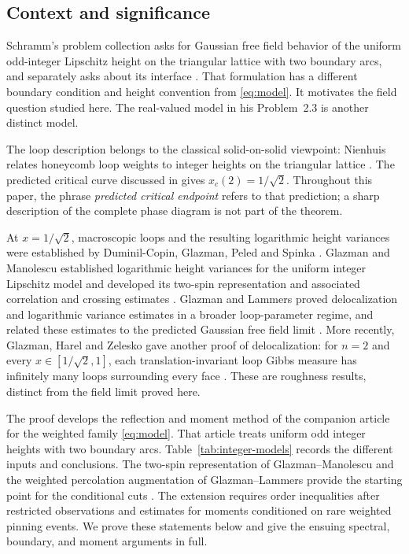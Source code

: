 \subsection{Context and significance}

Schramm's problem collection asks for Gaussian free field behavior of the
uniform odd-integer Lipschitz height on the triangular lattice with two
boundary arcs, and separately asks about its interface
\cite[Problem~2.2]{Schramm2007}.  That formulation has a different boundary
condition and height convention from \eqref{eq:model}.  It motivates the
field question studied here.  The real-valued model in his Problem~2.3 is
another distinct model.

The loop description belongs to the classical solid-on-solid viewpoint:
Nienhuis relates honeycomb loop weights to integer heights on the
triangular lattice \cite[p.~1062]{Nienhuis1982}.
The predicted critical curve discussed in
\cite[Section~1.4.1]{GL2025} gives $x_c(2)=1/\sqrt2$.
Throughout this paper, the phrase \emph{predicted critical endpoint}
refers to that prediction; a sharp description of the complete phase
diagram is not part of the theorem.

At $x=1/\sqrt2$, macroscopic loops and the resulting logarithmic height
variances were established by Duminil-Copin, Glazman, Peled and Spinka
\cite[Theorem~1 and Section~1.2]{DGPS2021}.
Glazman and Manolescu established logarithmic height variances for the uniform
integer Lipschitz model and developed its two-spin representation and
associated correlation and crossing estimates \cite{GM2021}.
Glazman and Lammers proved delocalization and logarithmic variance
estimates in a broader loop-parameter regime, and related these estimates
to the predicted Gaussian free field limit
\cite[Section~1.2.4]{GL2025}.  More recently, Glazman, Harel and Zelesko
gave another proof of delocalization: for $n=2$ and every
$x\in[1/\sqrt2,1]$, each translation-invariant loop Gibbs measure
has infinitely many loops surrounding every face
\cite[Theorem~2]{GHZ2025}.  These are roughness results, distinct from
the field limit proved here.

The proof develops the reflection and moment method of
the companion article \cite[Sections~5, 7, 9, and 10]{UniformIntegerGFF}
for the weighted family \eqref{eq:model}.  That article treats uniform
odd integer heights with two boundary arcs.  Table~\ref{tab:integer-models}
records the different inputs and conclusions.
The two-spin representation of Glazman--Manolescu and the weighted
percolation augmentation of Glazman--Lammers provide the starting point
for the conditional cuts \cite{GM2021,GL2025}.  The extension requires
order inequalities after restricted observations and estimates for
moments conditioned on rare weighted pinning events.  We prove these
statements below and give the ensuing spectral, boundary, and moment
arguments in full.

